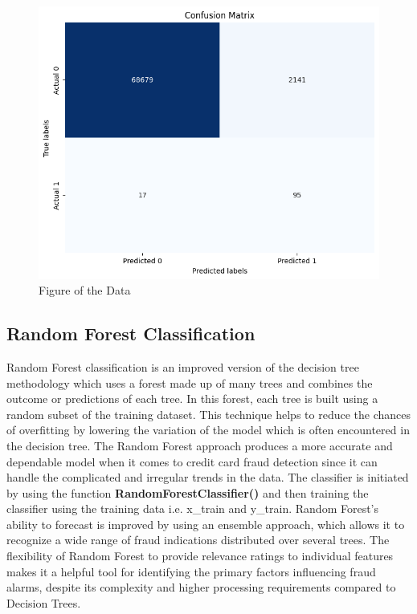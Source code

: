 \begin{figure}[ht]
    \centering
    \includegraphics[scale=0.9]{figures/CM_GridSearch.png}
    \caption{Figure of the Data}
    \label{fig:Plot of the Data}
\end{figure}

\clearpage


\subsection{Random Forest Classification}

Random Forest classification is an improved version of the decision tree methodology which uses a forest made up of many trees and combines the outcome or predictions of each tree. In this forest, each tree is built using a random subset of the training dataset. This technique helps to reduce the chances of overfitting by lowering the variation of the model which is often encountered in the decision tree. The Random Forest approach produces a more accurate and dependable model when it comes to credit card fraud detection since it can handle the complicated and irregular trends in the data. The classifier is initiated by using the function \textbf{RandomForestClassifier() }and then training the classifier using the training data i.e. x\_train and y\_train. Random Forest’s ability to forecast is improved by using an ensemble approach, which allows it to recognize a wide range of fraud indications distributed over several trees. The flexibility of Random Forest to provide relevance ratings to individual features makes it a helpful  tool for identifying the primary factors influencing fraud alarms, despite its complexity and higher processing requirements compared to Decision Trees.


